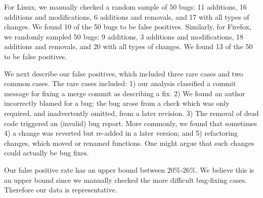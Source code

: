 For Linux, we manually checked a random sample of 50 bugs: 11
additions, 16 additions and modifications, 6 additions and removals,
and 17 with all types of changes. We found 10 of the 50 bugs to be
false positives. Similarly, for Firefox, we randomly sampled 50 bugs:
9 additions, 3 additions and modifications, 18 additions and removals,
and 20 with all types of changes. We found 13 of the 50 to be false
positives. 

We next describe our false positives, which included three rare cases
and two common cases. The rare cases included: 1) our analysis
classified a commit message for fixing a merge commit as describing a
fix. 2) We found an author incorrectly blamed for a bug: the bug arose
from a check which was only required, and inadvertently omitted, from
a later revision. 3) The removal of dead code triggered an (invalid)
bug report. More commonly, we found that sometimes 4) a change was
reverted but re-added in a later version; and 5) refactoring changes,
which moved or renamed functions. One might argue that such changes
could actually be bug fixes.

 
Our false positive rate has an upper bound between 20\%-26\%. We
believe this is an upper bound since we manually checked the more
difficult bug-fixing cases. Therefore our data is representative.

